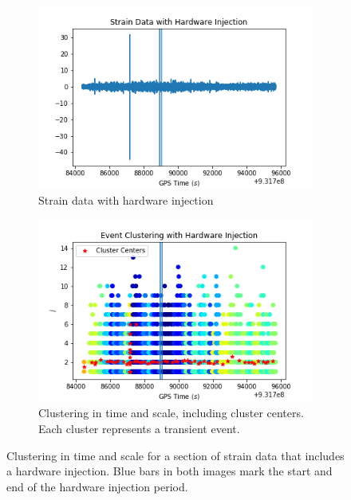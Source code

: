 \documentclass{article}
\begin{document}
\begin{figure}
\begin{subfigure}[t]{\textwidth}
\includegraphics[width=\textwidth]{hw_strain.png}
\caption{Strain data with hardware injection}
\label{fig:hw_strain}
\end{subfigure}

\begin{subfigure}[t]{\textwidth}
\includegraphics[width=\textwidth]{cluster.png}
\caption{Clustering in time and scale, including cluster centers. Each cluster represents a transient event.}
\label{fig:cluster}
\end{subfigure}
\caption{Clustering in time and scale for a section of strain data that includes a hardware injection. Blue bars in both images mark the start and end of the hardware injection period.}
\label{fig:event}
\end{figure}
\end{document}
